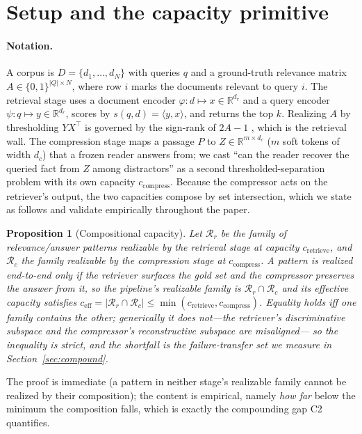 \documentclass{article}
\newtheorem{proposition}{Proposition}
\newcommand{\dr}{d_r}
\newcommand{\dc}{d_c}
\newcommand{\ceff}{c_{\mathrm{eff}}}
\newcommand{\R}{\mathbb{R}}
\newcommand{\ip}[2]{\langle #1, #2\rangle}
\begin{document}
\section{Setup and the capacity primitive}
\label{sec:setup}

\paragraph{Notation.} A corpus is $D=\{d_1,\dots,d_N\}$ with queries $q$ and a ground-truth
relevance matrix $A\in\{0,1\}^{|Q|\times N}$, where row $i$ marks the documents relevant to query
$i$. The retrieval stage uses a document encoder $\varphi:d\mapsto x\in\R^{\dr}$ and a query
encoder $\psi:q\mapsto y\in\R^{\dr}$, scores by $s(q,d)=\ip{y}{x}$, and returns the top $k$.
Realizing $A$ by thresholding $Y X^\top$ is governed by the sign-rank of $2A-1$
\citep{weller2025limit}, which is the retrieval wall. The compression stage maps a passage $P$ to
$Z\in\R^{m\times \dc}$ ($m$ soft tokens of width $\dc$) that a frozen reader answers from; we cast
``can the reader recover the queried fact from $Z$ among distractors'' as a second
thresholded-separation problem with its own capacity $c_{\mathrm{compress}}$. Because the
compressor acts on the retriever's output, the two capacities compose by set intersection, which we
state as follows and validate empirically throughout the paper.

\begin{proposition}[Compositional capacity]
\label{prop:compose}
Let $\mathcal{R}_r$ be the family of relevance/answer patterns realizable by the retrieval stage at
capacity $c_{\mathrm{retrieve}}$, and $\mathcal{R}_c$ the family realizable by the compression stage
at $c_{\mathrm{compress}}$. A pattern is realized end-to-end only if the retriever surfaces the gold
set \emph{and} the compressor preserves the answer from it, so the pipeline's realizable family is
$\mathcal{R}_r\cap\mathcal{R}_c$ and its effective capacity satisfies
$\ceff=|\mathcal{R}_r\cap\mathcal{R}_c|\le\min(c_{\mathrm{retrieve}},c_{\mathrm{compress}})$.
Equality holds iff one family contains the other; generically it does not---the retriever's
\emph{discriminative} subspace and the compressor's \emph{reconstructive} subspace are misaligned---
so the inequality is strict, and the shortfall is the failure-transfer set we measure in
Section~\ref{sec:compound}.
\end{proposition}

\noindent The proof is immediate (a pattern in neither stage's realizable family cannot be realized
by their composition); the content is empirical, namely \emph{how far} below the minimum the
composition falls, which is exactly the compounding gap C2 quantifies.
\end{document}
